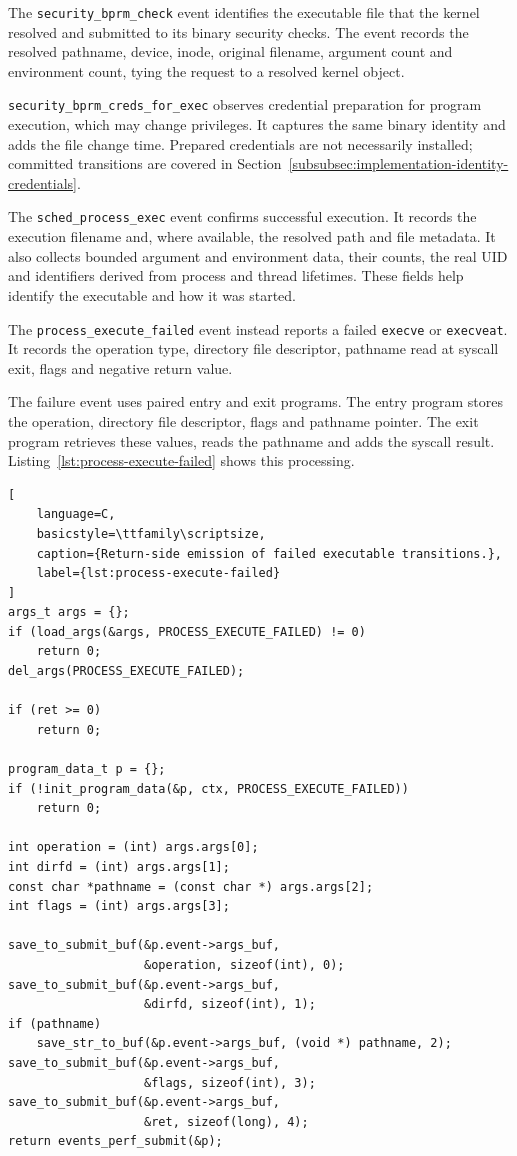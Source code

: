 The \texttt{security\_bprm\_check} event identifies the executable file that
the kernel resolved and submitted to its binary security checks. 
The event records the resolved pathname, device, inode, original filename, 
argument count and environment count, tying the request to a resolved kernel object.

\texttt{security\_bprm\_creds\_for\_exec} observes credential preparation for program execution, 
which may change privileges. It captures the same binary identity and adds the file change time. 
Prepared credentials are not necessarily installed; committed transitions are covered
in Section~\ref{subsubsec:implementation-identity-credentials}.

The \texttt{sched\_process\_exec} event confirms successful execution.
It records the execution filename and, where available, the resolved path
and file metadata. It also collects bounded argument and environment data,
their counts, the real UID and identifiers derived from process and thread
lifetimes. These fields help identify the executable and how it was started.

The \texttt{process\_execute\_failed} event instead reports a failed
\texttt{execve} or \texttt{execveat}. It records the operation type,
directory file descriptor, pathname read at syscall exit, flags and
negative return value.

The failure event uses paired entry and exit programs. The entry program
stores the operation, directory file descriptor, flags and pathname pointer.
The exit program retrieves these values, reads the pathname and adds the
syscall result. Listing~\ref{lst:process-execute-failed} shows this processing.

\begin{lstlisting}[
    language=C,
    basicstyle=\ttfamily\scriptsize,
    caption={Return-side emission of failed executable transitions.},
    label={lst:process-execute-failed}
]
args_t args = {};
if (load_args(&args, PROCESS_EXECUTE_FAILED) != 0)
    return 0;
del_args(PROCESS_EXECUTE_FAILED);

if (ret >= 0)
    return 0;

program_data_t p = {};
if (!init_program_data(&p, ctx, PROCESS_EXECUTE_FAILED))
    return 0;

int operation = (int) args.args[0];
int dirfd = (int) args.args[1];
const char *pathname = (const char *) args.args[2];
int flags = (int) args.args[3];

save_to_submit_buf(&p.event->args_buf,
                   &operation, sizeof(int), 0);
save_to_submit_buf(&p.event->args_buf,
                   &dirfd, sizeof(int), 1);
if (pathname)
    save_str_to_buf(&p.event->args_buf, (void *) pathname, 2);
save_to_submit_buf(&p.event->args_buf,
                   &flags, sizeof(int), 3);
save_to_submit_buf(&p.event->args_buf,
                   &ret, sizeof(long), 4);
return events_perf_submit(&p);
\end{lstlisting}


